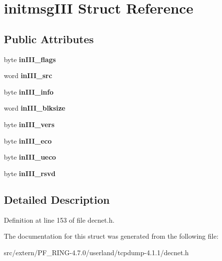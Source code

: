 \hypertarget{structinitmsg_i_i_i}{
\section{initmsgIII Struct Reference}
\label{structinitmsg_i_i_i}
}
\subsection*{Public Attributes}
\begin{DoxyCompactItemize}
\item 
\hypertarget{structinitmsg_i_i_i_a7555f4f4e4a52cccb0d63256cb6cfb4e}{
byte {\bfseries inIII\_\-flags}}
\label{structinitmsg_i_i_i_a7555f4f4e4a52cccb0d63256cb6cfb4e}

\item 
\hypertarget{structinitmsg_i_i_i_ab712a275aa5618ae258efe4914076db4}{
word {\bfseries inIII\_\-src}}
\label{structinitmsg_i_i_i_ab712a275aa5618ae258efe4914076db4}

\item 
\hypertarget{structinitmsg_i_i_i_a6f2ef6775957fdc6b45fc86e8b254c0d}{
byte {\bfseries inIII\_\-info}}
\label{structinitmsg_i_i_i_a6f2ef6775957fdc6b45fc86e8b254c0d}

\item 
\hypertarget{structinitmsg_i_i_i_ae27e6948bcf4ae1a9706cdeefa710ccc}{
word {\bfseries inIII\_\-blksize}}
\label{structinitmsg_i_i_i_ae27e6948bcf4ae1a9706cdeefa710ccc}

\item 
\hypertarget{structinitmsg_i_i_i_a43642815d6991c5322bfa185c74595b0}{
byte {\bfseries inIII\_\-vers}}
\label{structinitmsg_i_i_i_a43642815d6991c5322bfa185c74595b0}

\item 
\hypertarget{structinitmsg_i_i_i_a96ecd95748bebc34ea588e50b033b7c7}{
byte {\bfseries inIII\_\-eco}}
\label{structinitmsg_i_i_i_a96ecd95748bebc34ea588e50b033b7c7}

\item 
\hypertarget{structinitmsg_i_i_i_a680f6e8c521daac569c6456fd32b60ca}{
byte {\bfseries inIII\_\-ueco}}
\label{structinitmsg_i_i_i_a680f6e8c521daac569c6456fd32b60ca}

\item 
\hypertarget{structinitmsg_i_i_i_a603b6154d444b1287c99025898858355}{
byte {\bfseries inIII\_\-rsvd}}
\label{structinitmsg_i_i_i_a603b6154d444b1287c99025898858355}

\end{DoxyCompactItemize}


\subsection{Detailed Description}


Definition at line 153 of file decnet.h.



The documentation for this struct was generated from the following file:\begin{DoxyCompactItemize}
\item 
src/extern/PF\_\-RING-\/4.7.0/userland/tcpdump-\/4.1.1/decnet.h\end{DoxyCompactItemize}
